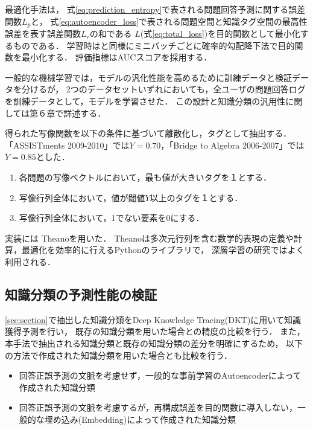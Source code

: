 最適化手法は，
式\ref{eq:prediction_entropy}で表される問題回答予測に関する誤差関数$L_p$と，
式\ref{eq:autoencoder_loss}で表される問題空間と知識タグ空間の最高性誤差を表す誤差関数$L_r$の和である
$L$(式\ref{eq:total_loss})を目的関数として最小化するものである．
学習時は\cite{piech2015deep}と同様にミニバッチごとに確率的勾配降下法で目的関数を最小化する．
評価指標はAUCスコアを採用する．

一般的な機械学習では，モデルの汎化性能を高めるために訓練データと検証データを分けるが，
2つのデータセットいずれにおいても，全ユーザの問題回答ログを訓練データとして，モデルを学習させた．
この設計と知識分類の汎用性に関しては第６章で詳述する．

得られた写像関数を以下の条件に基づいて離散化し，タグとして抽出する．
「ASSISTments 2009-2010」では$Y = 0.70$，「Bridge to Algebra 2006-2007」では$Y = 0.85$とした．
\begin{enumerate}
\item 各問題の写像ベクトルにおいて，最も値が大きいタグを１とする．
\item 写像行列全体において，値が閾値$Y$以上のタグを１とする．
\item 写像行列全体において，1でない要素を0にする．
\end{enumerate}

実装には
Theano\cite{bergstra+al:2010-scipy,Bastien-Theano-2012}を用いた．
Theanoは多次元行列を含む数学的表現の定義や計算，最適化を効率的に行えるPythonのライブラリで，
深層学習の研究ではよく利用される．


\subsection{知識分類の予測性能の検証}

\ref{sec:section}で抽出した知識分類をDeep Knowledge Tracing(DKT)に用いて知識獲得予測を行い，
既存の知識分類を用いた場合との精度の比較を行う．
また，本手法で抽出される知識分類と既存の知識分類の差分を明確にするため，
以下の方法で作成された知識分類を用いた場合とも比較を行う．
\begin{itemize}
\item 回答正誤予測の文脈を考慮せず，一般的な事前学習のAutoencoderによって作成された知識分類 \label{c1}
\item 回答正誤予測の文脈を考慮するが，再構成誤差を目的関数に導入しない，一般的な埋め込み(Embedding)によって作成された知識分類 \label{c2}
\end{itemize}

